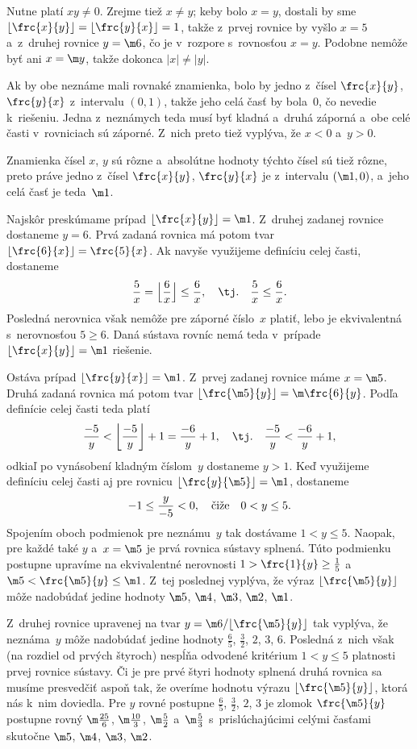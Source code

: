 {%
Nutne platí $xy\ne0$. Zrejme tiež $x\ne y$;
keby bolo $x=y$, dostali by sme $\lfloor \frc{x}{y}\rfloor =
\lfloor \frc{y}{x} \rfloor =1$, takže z~prvej rovnice by vyšlo
$x=5$ a~z~druhej rovnice $y=\m6$, čo je v~rozpore s~rovnosťou $x=y$.
Podobne nemôže byť ani $x =\m y$, takže dokonca $|x|\ne|y|$.

Ak by obe neznáme mali rovnaké znamienka, bolo by jedno z~čísel
$\frc{x}{y}$, $\frc{y}{x}$ z~intervalu $(0, 1)$, takže jeho celá časť by
bola~$0$, čo nevedie k~riešeniu. Jedna z~neznámych teda musí byť kladná a~druhá
záporná a~obe celé časti v~rovniciach sú záporné. Z~nich preto tiež
vyplýva, že $x<0$ a~$y>0$.

Znamienka čísel $x$, $y$ sú rôzne a~absolútne hodnoty týchto čísel sú tiež
rôzne, preto práve jedno z~čísel $\frc{x}{y}$, $\frc{y}{x}$ je z~intervalu
$(\m1, 0)$, a~jeho celá časť je teda~$\m1$.

Najskôr preskúmame prípad $\lfloor \frc{x}{y} \rfloor=\m1$.
Z~druhej zadanej rovnice dostaneme $y=6$. Prvá zadaná rovnica
má potom tvar $\lfloor \frc{6}{x}\rfloor=\frc{5}{x}$. Ak navyše využijeme
definíciu celej časti, dostaneme
$$
\frac{5}{x}=\Bigl\lfloor \frac{6}{x}\Bigr\rfloor \le \frac{6}{x},
\quad\hbox{\tj.}\quad \frac{5}{x} \le \frac{6}{x}.
$$
Posledná nerovnica však nemôže pre záporné číslo~$x$ platiť, lebo je
ekvivalentná s~nerovnosťou $5 \ge 6$. Daná sústava
rovníc nemá teda v~prípade $\lfloor \frc{x}{y}\rfloor=\m1$ riešenie.

Ostáva prípad $\lfloor\frc{y}{x}\rfloor=\m1$.
Z~prvej zadanej rovnice máme $x=\m5$. Druhá zadaná rovnica
má potom tvar $\lfloor \frc{\m5}{y}\rfloor=\m\frc{6}{y}$. Podľa
definície celej časti teda platí
$$
\frac{-5}{y}<\left\lfloor \frac{-5}{y}\right\rfloor +1
=\frac{-6}{y}+1,\quad\hbox{\tj.}\quad  \frac{-5}{y}<\frac{-6}{y}+1,
$$
odkiaľ
po vynásobení kladným číslom~$y$ dostaneme $y>1$. Keď využijeme definíciu celej
časti aj pre rovnicu $\lfloor \frc{y}{\m5}\rfloor=\m1$, dostaneme
$$
-1\le\frac{y}{-5}<0, \quad\hbox{čiže}\quad 0<y\le 5.
$$
Spojením oboch podmienok pre neznámu~$y$ tak dostávame $1<y\le5$.
Naopak, pre každé také $y$ a~$x=\m5$ je prvá rovnica sústavy splnená.
Túto podmienku postupne upravíme na ekvivalentné nerovnosti
$1>\frc{1}{y}\ge\frac{1}{5}$ a~$\m5<\frc{\m5}{y}\le\m1$.
Z~tej poslednej vyplýva, že výraz $\lfloor \frc{\m5}{y}\rfloor$ môže nadobúdať
jedine hodnoty $\m5$, $\m4$, $\m3$, $\m2$, $\m1$.

Z~druhej rovnice upravenej na tvar
$y=\m6/\lfloor \frc{\m5}{y}\rfloor$
tak vyplýva, že neznáma~$y$ môže nadobúdať jedine hodnoty
$\frac65$, $\frac32$, $2$, $3$, $6$.
Posledná z~nich však (na rozdiel od prvých štyroch) nespĺňa odvodené
kritérium $1<y\le 5$ platnosti prvej rovnice sústavy. Či je pre
prvé štyri hodnoty splnená druhá rovnica sa musíme presvedčiť
aspoň tak, že overíme hodnotu výrazu $\lfloor \frc{\m5}{y}\rfloor$,
ktorá nás k~nim doviedla. Pre $y$ rovné postupne
$\frac65$, $\frac32$, $2$, $3$ je zlomok $\frc{\m5}{y}$ postupne rovný
$\m\frac{25}6$, $\m\frac{10}3$, $\m\frac{5}2$ a~$\m\frac{5}3$ s~prislúchajúcimi
celými časťami skutočne $\m5$, $\m4$, $\m3$, $\m2$.

}
